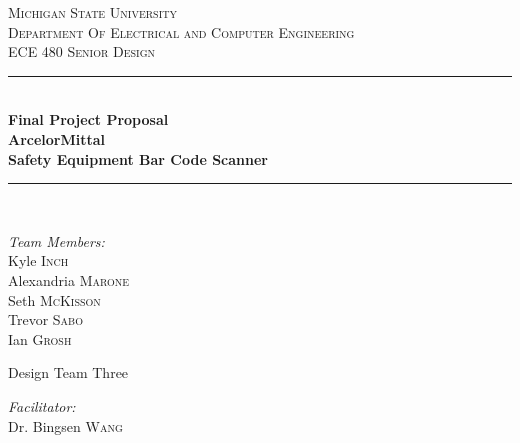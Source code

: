 \begin{titlepage}
		             
		\newcommand{\HRule}{\rule{\linewidth}{0.5mm}} %
		
		\center %
		
		
		\textsc{\LARGE Michigan State University}\\[0.5cm] %
		\textsc{\Large Department Of Electrical and Computer Engineering}\\[0.5cm] %
		\textsc{\Large ECE 480 Senior Design}\\[0.5cm]
		
		
		\HRule \\[0.2cm]
		{ \huge \bfseries Final Project Proposal\\ ArcelorMittal \\ Safety Equipment Bar Code Scanner}\\ %
		\HRule \\[1.5cm]
		
		\noindent
		\begin{minipage}[t]{0.3\textwidth}
			\begin{flushleft} \large
				\emph{Team Members:}\\
				Kyle \textsc{Inch}\\
				Alexandria \textsc{Marone}\\
				Seth \textsc{McKisson}\\
				Trevor \textsc{Sabo}\\
				Ian \textsc{Grosh}\\ %
			\end{flushleft}
		\end{minipage}%
		\begin{minipage}{0.3\textwidth}
			\centering
			{\LARGE Design Team Three}
		\end{minipage}
		\begin{minipage}[t]{0.3\textwidth}
			\begin{flushright} \large
				\emph{Facilitator:}\\  %
				Dr. Bingsen \textsc{Wang}
				

\end{flushright}
\end{minipage}
\end{titlepage}
